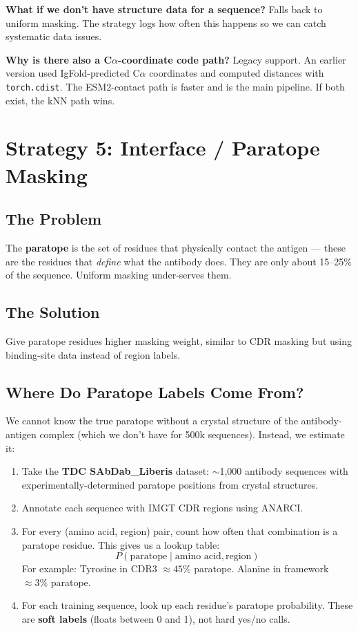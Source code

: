 \documentclass[11pt]{article}
\begin{document}
\textbf{What if we don't have structure data for a sequence?}
Falls back to uniform masking. The strategy logs how often this
happens so we can catch systematic data issues.

\textbf{Why is there also a C$\alpha$-coordinate code path?}
Legacy support. An earlier version used IgFold-predicted
C$\alpha$ coordinates and computed distances with
\texttt{torch.cdist}. The ESM2-contact path is faster and is
the main pipeline. If both exist, the kNN path wins.

\section{Strategy 5: Interface / Paratope Masking}
\label{sec:interface}

\subsection{The Problem}
The \textbf{paratope} is the set of residues that physically
contact the antigen --- these are the residues that \emph{define}
what the antibody does. They are only about 15--25\% of the
sequence. Uniform masking under-serves them.

\subsection{The Solution}
Give paratope residues higher masking weight, similar to CDR
masking but using binding-site data instead of region labels.

\subsection{Where Do Paratope Labels Come From?}
We cannot know the true paratope without a crystal structure of
the antibody-antigen complex (which we don't have for 500k
sequences). Instead, we estimate it:

\begin{enumerate}
\item Take the \textbf{TDC SAbDab\_Liberis} dataset: $\sim$1,000
      antibody sequences with experimentally-determined paratope
      positions from crystal structures.
\item Annotate each sequence with IMGT CDR regions using ANARCI.
\item For every (amino acid, region) pair, count how often that
      combination is a paratope residue. This gives us a lookup
      table:
      \[
      P(\text{paratope} \mid \text{amino acid}, \text{region})
      \]
      For example: Tyrosine in CDR3 $\approx 45\%$ paratope.
      Alanine in framework $\approx 3\%$ paratope.
\item For each training sequence, look up each residue's
      paratope probability. These are \textbf{soft labels}
      (floats between 0 and 1), not hard yes/no calls.
\end{enumerate}
\end{document}
